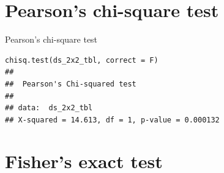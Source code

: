 \documentclass[12pt, t, xcolor=dvipsnames]{beamer}
\makeatletter
\newcommand*{\indep}{%
  \mathbin{%
    \mathpalette{\@indep}{}%
  }%
}
\newcommand*{\nindep}{%
  \mathbin{%
    \mathpalette{\@indep}{\not}%
  }%
}
\newcommand*{\@indep}[2]{%
  \sbox0{$#1\perp\m@th$}%
  \sbox2{$#1=$}%
  \sbox4{$#1\vcenter{}$}%
  \rlap{\copy0}%
  \dimen@=\dimexpr\ht2-\ht4-.2pt\relax
  \kern\dimen@
  {#2}%
  \kern\dimen@
  \copy0 %
}
\makeatother
\begin{document}
\section{Pearson's chi-square test} %
\label{sec:pearson_s_chi_square_test}




\begin{frame}[fragile]{Pearson's chi-square test}
\begin{verbatim}
chisq.test(ds_2x2_tbl, correct = F)
## 
##  Pearson's Chi-squared test
## 
## data:  ds_2x2_tbl
## X-squared = 14.613, df = 1, p-value = 0.000132
\end{verbatim}

\end{frame}




\section{Fisher's exact test} %
\label{sec:fisher_s_exact_test}
\end{document}
